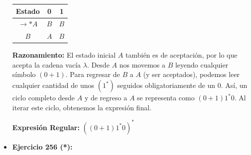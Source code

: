 \documentclass[12pt]{article}
\begin{document}
\begin{itemize}
    \begin{minipage}{0.4\textwidth}
    \begin{tabular}{|c|c|c|}
    \hline
    \textbf{Estado} & \textbf{0} & \textbf{1} \\
    \hline
    $\rightarrow *A$ & $B$ & $B$ \\
    \hline
    $B$ & $A$ & $B$ \\
    \hline
    \end{tabular}
    \end{minipage}
    \begin{minipage}{0.5\textwidth}
    \end{minipage}

    \vspace{0.2cm}
    \textbf{Razonamiento:} El estado inicial $A$ también es de aceptación, por lo que acepta la cadena vacía $\lambda$. Desde $A$ nos movemos a $B$ leyendo cualquier símbolo $(0+1)$. Para regresar de $B$ a $A$ (y ser aceptados), podemos leer cualquier cantidad de unos $(1^*)$ seguidos obligatoriamente de un $0$. Así, un ciclo completo desde $A$ y de regreso a $A$ se representa como $(0+1)1^*0$. Al iterar este ciclo, obtenemos la expresión final.
    
    \textbf{Expresión Regular:} $((0+1)1^*0)^*$

    \vspace{0.6cm}

    \item \textbf{Ejercicio 256 (*):}
    

\end{itemize}
\end{document}
